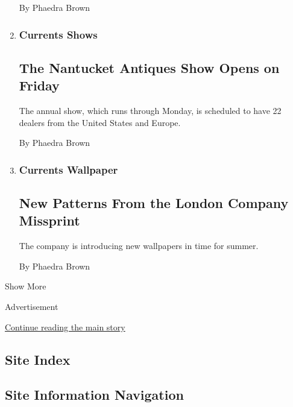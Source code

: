 \begin{enumerate}
  By Phaedra Brown
\item
  \href{/2010/07/29/garden/29shows.html}{}

  \hypertarget{currents--shows}{%
  \subsubsection{Currents \textbar{} Shows}\label{currents--shows}}

  \hypertarget{the-nantucket-antiques-show-opens-on-friday}{%
  \subsection{The Nantucket Antiques Show Opens on
  Friday}\label{the-nantucket-antiques-show-opens-on-friday}}

  The annual show, which runs through Monday, is scheduled to have 22
  dealers from the United States and Europe.

  By Phaedra Brown
\item
  \href{/2010/06/24/garden/24wallpaper.html}{}

  \hypertarget{currents--wallpaper}{%
  \subsubsection{Currents \textbar{}
  Wallpaper}\label{currents--wallpaper}}

  \hypertarget{new-patterns-from-the-london-company-missprint}{%
  \subsection{New Patterns From the London Company
  Missprint}\label{new-patterns-from-the-london-company-missprint}}

  The company is introducing new wallpapers in time for summer.

  By Phaedra Brown
\end{enumerate}

Show More

Advertisement

\protect\hyperlink{after-mid2}{Continue reading the main story}

\hypertarget{site-index}{%
\subsection{Site Index}\label{site-index}}

\hypertarget{site-information-navigation}{%
\subsection{Site Information
Navigation}\label{site-information-navigation}}

